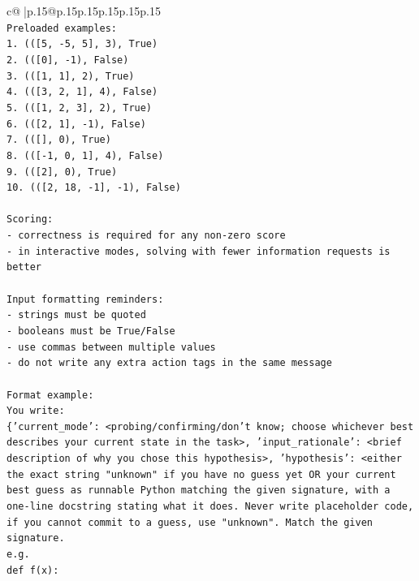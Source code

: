 \documentclass{article}
\begin{document}
{\begin{supertabular}{c@{$\;$}|p{.15\linewidth}@{}p{.15\linewidth}p{.15\linewidth}p{.15\linewidth}p{.15\linewidth}p{.15\linewidth}}
{{{\\ 
\texttt{Preloaded examples:} \\
\texttt{1. (({[}5, {-}5, 5{]}, 3), True)} \\
\texttt{2. (({[}0{]}, {-}1), False)} \\
\texttt{3. (({[}1, 1{]}, 2), True)} \\
\texttt{4. (({[}3, 2, 1{]}, 4), False)} \\
\texttt{5. (({[}1, 2, 3{]}, 2), True)} \\
\texttt{6. (({[}2, 1{]}, {-}1), False)} \\
\texttt{7. (({[}{]}, 0), True)} \\
\texttt{8. (({[}{-}1, 0, 1{]}, 4), False)} \\
\texttt{9. (({[}2{]}, 0), True)} \\
\texttt{10. (({[}2, 18, {-}1{]}, {-}1), False)} \\
\\ 
\texttt{Scoring:} \\
\texttt{{-} correctness is required for any non{-}zero score} \\
\texttt{{-} in interactive modes, solving with fewer information requests is better} \\
\\ 
\texttt{Input formatting reminders:} \\
\texttt{{-} strings must be quoted} \\
\texttt{{-} booleans must be True/False} \\
\texttt{{-} use commas between multiple values} \\
\texttt{{-} do not write any extra action tags in the same message} \\
\\ 
\texttt{Format example:} \\
\texttt{You write:} \\
\texttt{\{'current\_mode': <probing/confirming/don't know; choose whichever best describes your current state in the task>, 'input\_rationale': <brief description of why you chose this hypothesis>, 'hypothesis': <either the exact string "unknown" if you have no guess yet OR your current best guess as runnable Python matching the given signature, with a one{-}line docstring stating what it does. Never write placeholder code, if you cannot commit to a guess, use "unknown". Match the given signature.} \\
\texttt{e.g.} \\
\texttt{def f(x):} \\
}}}
\end{supertabular}}
\end{document}
